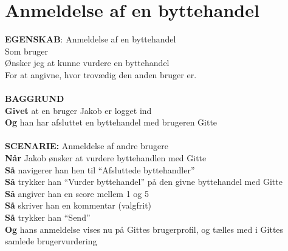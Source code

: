 \section{Anmeldelse af en byttehandel}
{\color{blue}\textbf{EGENSKAB}:} Anmeldelse af en byttehandel \\
Som bruger \\
Ønsker jeg at kunne vurdere en byttehandel \\
For at angivne, hvor trovædig den anden bruger er.\\ \\
{\color{blue}\textbf{BAGGRUND}} \\
{\color{blue}\textbf{Givet}} at en bruger Jakob er logget ind \\
{\color{blue}\textbf{Og}} han har afsluttet en byttehandel med brugeren Gitte\\\\
{\color{blue}\textbf{SCENARIE:}} Anmeldelse af andre brugere \\
{\color{blue}\textbf{Når}} Jakob ønsker at vurdere byttehandlen med Gitte\\
{\color{blue}\textbf{Så}} navigerer han hen til “Afsluttede byttehandler”\\
{\color{blue}\textbf{Så}} trykker han “Vurder byttehandel” på den givne byttehandel med Gitte\\
{\color{blue}\textbf{Så}} angiver han en score mellem 1 og 5\\
{\color{blue}\textbf{Så}} skriver han en kommentar (valgfrit)\\
{\color{blue}\textbf{Så}} trykker han “Send”\\
{\color{blue}\textbf{Og}} hans anmeldelse vises nu på Gittes brugerprofil, og tælles med i Gittes samlede brugervurdering



